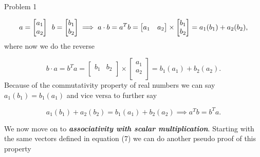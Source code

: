 \begin{problem}{Problem 1}
\begin{Highlight}
        \begin{equation}
            a = 
            \begin{bmatrix}
                a_{1} \\
                a_{2} \\
            \end{bmatrix}
            \hspace*{5pt}
            b = 
            \begin{bmatrix}
                b_{1} \\
                b_{2} \\
            \end{bmatrix}
            \implies
            a \cdot b = a^{T}b =
            \begin{bmatrix}
                a_{1} & a_{2} \\
            \end{bmatrix}
            \times
            \begin{bmatrix}
                b_{1} \\
                b_{2} \\
            \end{bmatrix}
            = a_{1}(b_{1}) + a_{2}(b_{2}),
        \end{equation}
        where now we do the reverse

        \begin{equation}
            b \cdot a = b^{T}a =
            \begin{bmatrix}
                b_{1} & b_{2} \\
            \end{bmatrix}
            \times
            \begin{bmatrix}
                a_{1} \\
                a_{2} \\
            \end{bmatrix}
            = b_{1}(a_{1}) + b_{2}(a_{2}).
        \end{equation}
        Because of the commutativity property of real numbers we can say $a_{1}(b_{1}) = b_{1}(a_{1})$ and vice versa to further say
        
        \begin{equation}
            a_{1}(b_{1}) + a_{2}(b_{2}) = b_{1}(a_{1}) + b_{2}(a_{2})
            \implies
            a^{T}b = b^{T}a.
        \end{equation}

        We now move on to \textbf{\textit{associativity with scalar multiplication}}. Starting with the same vectors defined in equation (7) we can do another pseudo proof of this property


\end{Highlight}
\end{problem}
